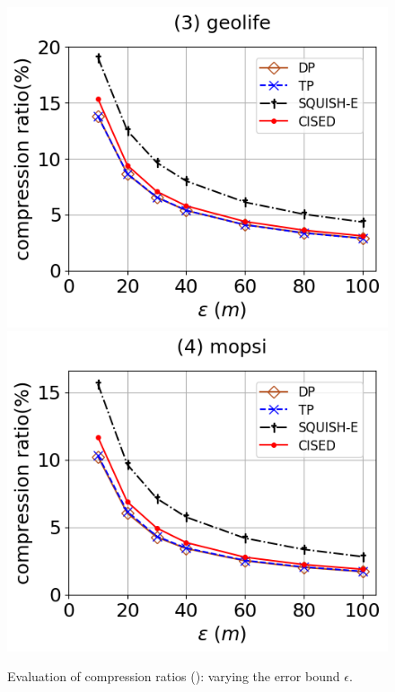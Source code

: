 \begin{figure}[tb!]
	\includegraphics[scale=0.315]{Figures/Exp-SED-CR-epsilon-geolife.png}	\hspace{1ex}
	\includegraphics[scale=0.315]{Figures/Exp-SED-CR-epsilon-mopsi.png}		
	\vspace{-3ex}
	\caption{\small Evaluation of compression ratios (\sed): varying the error bound $\epsilon$.}
	\label{fig:cr-sed-epsilon}
	\vspace{-2ex}
\end{figure}

